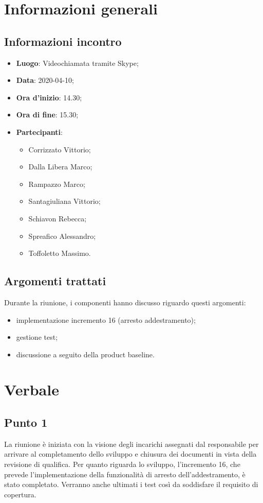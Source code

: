 \section{Informazioni generali}
    \subsection{Informazioni incontro}
        \begin{itemize}
            \item \textbf{Luogo}: Videochiamata tramite Skype;
            \item \textbf{Data}: 2020-04-10;
            \item \textbf{Ora d'inizio}: 14.30;
            \item \textbf{Ora di fine}: 15.30;
            \item \textbf{Partecipanti}: \begin{itemize}
                \item Corrizzato Vittorio;
                \item Dalla Libera Marco;
                \item Rampazzo Marco;
                \item Santagiuliana Vittorio;
                \item Schiavon Rebecca;
                \item Spreafico Alessandro;
                \item Toffoletto Massimo.
            \end{itemize}
        \end{itemize}
    \subsection{Argomenti trattati}
        Durante la riunione, i componenti hanno discusso riguardo questi argomenti:
        \begin{itemize}
            \item implementazione incremento 16 (arresto addestramento);
            \item gestione test;
            \item discussione a seguito della product baseline.
        \end{itemize}
\section{Verbale}
    \subsection{Punto 1}
        La riunione è iniziata con la visione degli incarichi assegnati dal responsabile per arrivare al completamento dello sviluppo e chiusura dei documenti in vista della revisione di qualifica. Per quanto riguarda lo sviluppo, l'incremento 16, che prevede l'implementazione della funzionalità di arresto dell'addestramento, è stato completato. Verranno anche ultimati i test così da soddisfare il requisito di copertura. 
